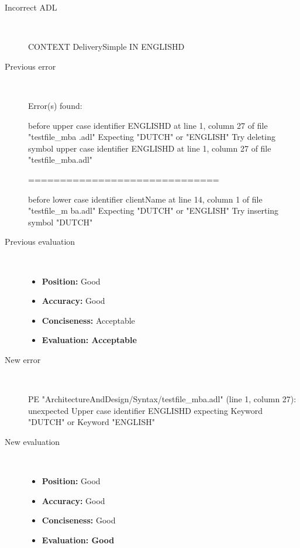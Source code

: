 \hrulefill

\begin{description}
  \item[Incorrect ADL]~\\
\begin{adl}
CONTEXT DeliverySimple IN ENGLISHD\end{adl}
  \item[Previous error]~\\
\begin{haskell}
Error(s) found:

before upper case identifier ENGLISHD at line 1, column 27 of file "testfile_mba
.adl"
Expecting "DUTCH" or "ENGLISH"
Try deleting symbol upper case identifier ENGLISHD at line 1, column 27 of file
"testfile_mba.adl"

==============================

before lower case identifier clientName at line 14, column 1 of file "testfile_m
ba.adl"
Expecting "DUTCH" or "ENGLISH"
Try inserting symbol "DUTCH"\end{haskell}
  \item[Previous evaluation]~\\
    \begin{itemize}
    \item \textbf{Position:} Good
    \item \textbf{Accuracy:} Good
    \item \textbf{Conciseness:} Acceptable
    \item \textbf{Evaluation: Acceptable}
    \end{itemize}
  \item[New error]~\\
\begin{haskell}
PE "ArchitectureAndDesign/Syntax/testfile_mba.adl" (line 1, column 27):
unexpected Upper case identifier ENGLISHD
expecting Keyword "DUTCH" or Keyword "ENGLISH"\end{haskell}
  \item[New evaluation]~\\
    \begin{itemize}
    \item \textbf{Position:} Good
    \item \textbf{Accuracy:} Good
    \item \textbf{Conciseness:} Good
    \item \textbf{Evaluation: Good}
    \end{itemize}
  \end{description}

